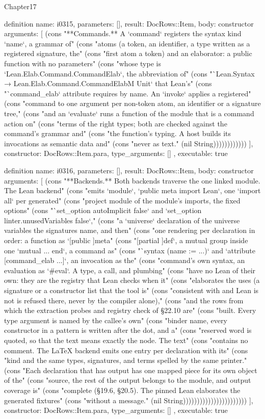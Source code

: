 \begin{lexlean}{Chapter17}
\begin{semanticmodule}
definition{
  name: i0315,
  parameters: [],
  result: DocRows::Item,
  body: constructor{
    arguments: [
      (cons "**Commands.** A `command` registers the syntax kind `name`, a grammar of" (cons "atoms (a token, an identifier, a type written as a registered signature, the" (cons "first atom a token) and an elaborator: a public function with no parameters" (cons "whose type is `Lean.Elab.Command.CommandElab`, the abbreviation of" (cons "`Lean.Syntax → Lean.Elab.Command.CommandElabM Unit` that Lean's" (cons "`command_elab` attribute requires by name. An `invoke` applies a registered" (cons "command to one argument per non-token atom, an identifier or a signature tree," (cons "and an `evaluate` runs a function of the module that is a command action on" (cons "terms of the right types; both are checked against the command's grammar and" (cons "the function's typing. A host builds its invocations as semantic data and" (cons "never as text." (nil String))))))))))))
    ],
    constructor: DocRows::Item.para,
    type_arguments: []
  },
  executable: true
}

definition{
  name: i0316,
  parameters: [],
  result: DocRows::Item,
  body: constructor{
    arguments: [
      (cons "**Backends.** Both backends traverse the one linked module. The Lean backend" (cons "emits `module`, `public meta import Lean`, one `import all` per generated" (cons "project module of the module's imports, the fixed options" (cons "`set_option autoImplicit false` and `set_option linter.unusedVariables false`," (cons "a `universe` declaration of the universe variables the signatures name, and then" (cons "one rendering per declaration in order: a function as `[public ]meta" (cons "[partial ]def`, a mutual group inside one `mutual ... end`, a command as" (cons "`syntax (name := ...)` and `attribute [command_elab ...]`, an invocation as the" (cons "command's own syntax, an evaluation as `#eval`. A type, a call, and plumbing" (cons "have no Lean of their own: they are the registry that Lean checks when it" (cons "elaborates the uses (a signature or a constructor list that the tool is" (cons "consistent with and Lean is not is refused there, never by the compiler alone)," (cons "and the rows from which the extraction probes and registry check of §22.10 are" (cons "built. Every type argument is named by the callee's own" (cons "binder name, every constructor in a pattern is written after the dot, and a" (cons "reserved word is quoted, so that the text means exactly the node. The text" (cons "contains no comment. The LaTeX backend emits one entry per declaration with its" (cons "kind and the same types, signatures, and terms spelled by the same printer." (cons "Each declaration that has output has one mapped piece for its own object of the" (cons "source, the rest of the output belongs to the module, and output coverage is" (cons "complete (§19.6, §20.5). The pinned Lean elaborates the generated fixtures" (cons "without a message." (nil String)))))))))))))))))))))))
    ],
    constructor: DocRows::Item.para,
    type_arguments: []
  },
  executable: true
}


\end{semanticmodule}
\end{lexlean}
